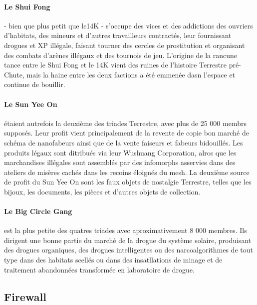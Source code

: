                                              \paragraph{Le Shui Fong} \label{sec:shui-fong} - bien que plus petit que le14K - s'occupe des vices et des addictions des ouvriers d'habitats, des mineurs et d'autres travailleurs contractés, leur fournissant drogues et XP illégale, faisant tourner des cercles de prostitution et organisant des combats d'arènes illégaux et des tournois de jeu. L'origine de la rancune tance entre le  Shui Fong et le 14K vient des ruines de l'histoire Terrestre pré-Chute, mais la haine entre les deux factions a été emmenée dasn l'espace et continue de bouillir. 

                                             \paragraph{Le Sun Yee On} \label{sec:sun-yee} étaient autrefois la deuxième des triades Terrestre, avec plus de 25 000 membrs supposés. Leur profit vient principalement de la revente de copie bon marché de schéma de nanofabeurs ainsi que de la vente faiseurs et fabeurs bidouillés. Les produits légaux sont ditribués via leur Wushuang Corporation, alros que les marchandises illégales sont assemblés par des infomorphs asservies dans des ateliers de misères cachés dans les recoins éloignés du mesh. La deuxième source de profit du Sun Yee On sont les faux objets de nostalgie Terrestre, telles que les bijoux, les documents, les pièces et d'autres objets de collection. 

                                             \paragraph{Le Big Circle Gang} \label{sec:big-circle-gang} est la plus petite des quatres triades avec aproximativement 8 000 membres. Ils dirigent une bonne partie du marché de la drogue du système solaire, produisant des drogues organiques, des drogues intelligentes ou des narcoalgorithmes de tout type dans des habitats scellés ou dans des insatllations de minage et de traitement abandonnées transformée en laboratoire de drogue. 

                                             \subsection{Firewall} \label{sec:firewall} 

